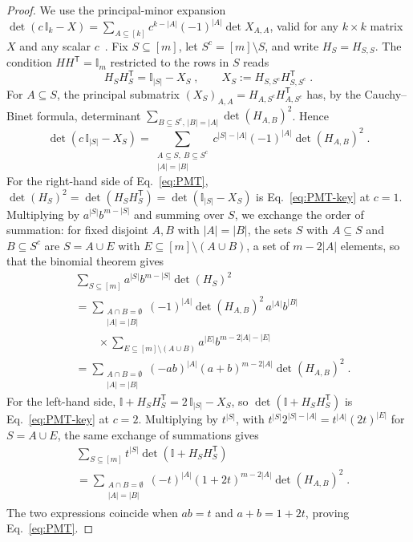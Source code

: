 \documentclass[prx,twocolumn,superscriptaddress,aps,10pt, frontmatterverbose, reprint,footinbib,longbibliography=true]{revtex4-2}
\newcommand{\trans}{\mathsf{T}}
\begin{document}
\begin{proof}
We use the principal-minor expansion $\det(c\,\mathbb{I}_k-X)=\sum_{A\subseteq[k]}c^{k-|A|}(-1)^{|A|}\det X_{A,A}$, valid for any $k\times k$ matrix $X$ and any scalar $c$~\cite{HornJohnson2012}. Fix $S\subseteq[m]$, let $S^c=[m]\setminus S$, and write $H_S=H_{S,S}$. The condition $HH^{\trans}=\mathbb{I}_m$ restricted to the rows in $S$ reads
\begin{equation}
    H_SH_S^{\trans}=\mathbb{I}_{|S|}-X_S\;,\qquad X_S:=H_{S,S^c}H_{S,S^c}^{\trans}\;.
\end{equation}
For $A\subseteq S$, the principal submatrix $(X_S)_{A,A}=H_{A,S^c}H_{A,S^c}^{\trans}$ has, by the Cauchy--Binet formula, determinant $\sum_{B\subseteq S^c,\,|B|=|A|}\det(H_{A,B})^2$. Hence
\begin{equation}
    \det\!\left(c\,\mathbb{I}_{|S|}-X_S\right)=\sum_{\substack{A\subseteq S,\ B\subseteq S^c\\|A|=|B|}}c^{|S|-|A|}(-1)^{|A|}\det(H_{A,B})^2\;.
    \label{eq:PMT-key}
\end{equation}
For the right-hand side of Eq.~\eqref{eq:PMT}, $\det(H_S)^2=\det(H_SH_S^{\trans})=\det(\mathbb{I}_{|S|}-X_S)$ is Eq.~\eqref{eq:PMT-key} at $c=1$. Multiplying by $a^{|S|}b^{m-|S|}$ and summing over $S$, we exchange the order of summation: for fixed disjoint $A,B$ with $|A|=|B|$, the sets $S$ with $A\subseteq S$ and $B\subseteq S^c$ are $S=A\cup E$ with $E\subseteq[m]\setminus(A\cup B)$, a set of $m-2|A|$ elements, so that the binomial theorem gives
\begin{equation}
\begin{split}
    &\sum_{S\subseteq[m]}a^{|S|}b^{m-|S|}\det(H_S)^2\\
    &=\sum_{\substack{A\cap B=\emptyset\\|A|=|B|}}(-1)^{|A|}\det(H_{A,B})^2\,a^{|A|}b^{|B|}\\
    &\qquad\times\sum_{E\subseteq[m]\setminus(A\cup B)}a^{|E|}b^{m-2|A|-|E|}\\
    &=\sum_{\substack{A\cap B=\emptyset\\|A|=|B|}}(-ab)^{|A|}(a+b)^{m-2|A|}\det(H_{A,B})^2\;.
\end{split}
\end{equation}
For the left-hand side, $\mathbb{I}+H_SH_S^{\trans}=2\,\mathbb{I}_{|S|}-X_S$, so $\det(\mathbb{I}+H_SH_S^{\trans})$ is Eq.~\eqref{eq:PMT-key} at $c=2$. Multiplying by $t^{|S|}$, with $t^{|S|}2^{|S|-|A|}=t^{|A|}(2t)^{|E|}$ for $S=A\cup E$, the same exchange of summations gives
\begin{equation}
\begin{split}
    &\sum_{S\subseteq[m]}t^{|S|}\det\!\left(\mathbb{I}+H_SH_S^{\trans}\right)\\
    &=\sum_{\substack{A\cap B=\emptyset\\|A|=|B|}}(-t)^{|A|}(1+2t)^{m-2|A|}\det(H_{A,B})^2\;.
\end{split}
\end{equation}
The two expressions coincide when $ab=t$ and $a+b=1+2t$, proving Eq.~\eqref{eq:PMT}.
\end{proof}
\end{document}
